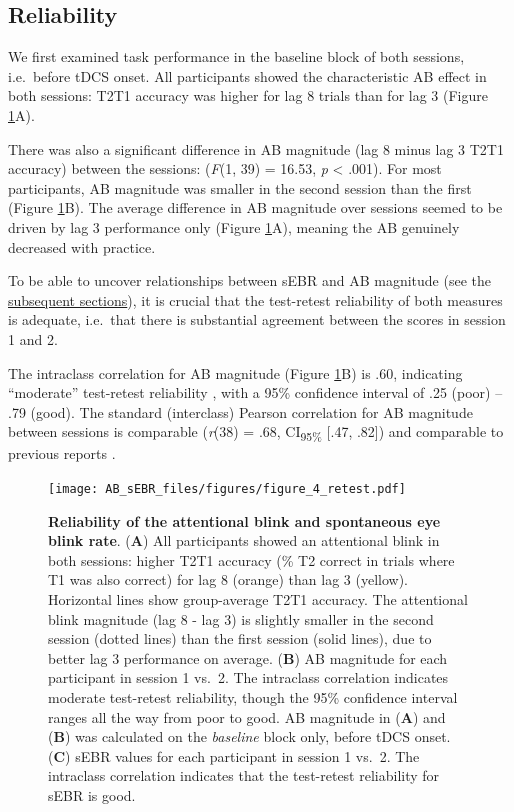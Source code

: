 \documentclass[11pt,]{memoir}
\begin{document}
\hypertarget{AB_sEBR-results-rel}{%
\subsection{Reliability}\label{AB_sEBR-results-rel}}

We first examined task performance in the baseline block of both sessions, i.e.~before tDCS onset. All participants showed the characteristic AB effect in both sessions: T2\textbar{}T1 accuracy was higher for lag 8 trials than for lag 3 (Figure \ref{fig:fig-retest}A).

There was also a significant difference in AB magnitude (lag 8 minus lag 3 T2\textbar{}T1 accuracy) between the sessions: (\emph{F}(1, 39) = 16.53, \emph{p} \textless{} .001). For most participants, AB magnitude was smaller in the second session than the first (Figure \ref{fig:fig-retest}B). The average difference in AB magnitude over sessions seemed to be driven by lag 3 performance only (Figure \ref{fig:fig-retest}A), meaning the AB genuinely decreased with practice.

To be able to uncover relationships between sEBR and AB magnitude (see the \protect\hyperlink{AB_sEBR-ABmag}{subsequent sections}), it is crucial that the test-retest reliability of both measures is adequate, i.e.~that there is substantial agreement between the scores in session 1 and 2.

The intraclass correlation for AB magnitude (Figure \ref{fig:fig-retest}B) is .60, indicating ``moderate'' test-retest reliability \autocite{Koo2016}, with a 95\% confidence interval of .25 (poor) -- .79 (good). The standard (interclass) Pearson correlation for AB magnitude between sessions is comparable (\emph{r}(38) = .68, CI\textsubscript{95\%} {[}.47, .82{]}) and comparable to previous reports \autocite{Dale2013}.

\begin{figure}
\centering
\texttt{[image: AB\_sEBR\_files/figures/figure\_4\_retest.pdf]}
\caption{\label{fig:fig-retest}\textbf{Reliability of the attentional blink and spontaneous eye blink rate}. (\textbf{A}) All participants showed an attentional blink in both sessions: higher T2\textbar{}T1 accuracy (\% T2 correct in trials where T1 was also correct) for lag 8 (orange) than lag 3 (yellow). Horizontal lines show group-average T2\textbar{}T1 accuracy. The attentional blink magnitude (lag 8 - lag 3) is slightly smaller in the second session (dotted lines) than the first session (solid lines), due to better lag 3 performance on average. (\textbf{B}) AB magnitude for each participant in session 1 vs.~2. The intraclass correlation indicates moderate test-retest reliability, though the 95\% confidence interval ranges all the way from poor to good. AB magnitude in (\textbf{A}) and (\textbf{B}) was calculated on the \emph{baseline} block only, before tDCS onset. (\textbf{C}) sEBR values for each participant in session 1 vs.~2. The intraclass correlation indicates that the test-retest reliability for sEBR is good.}
\end{figure}
\end{document}
